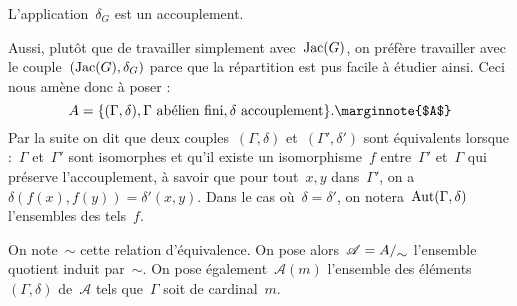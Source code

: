 	\begin{prop}
		L'application~$\delta_G$ est un accouplement.
	\end{prop}
	\begin{dem}
		[TODO]
	\end{dem}
	Aussi, plutôt que de travailler simplement avec~$\operatorname{Jac}(G)$, on préfère travailler avec le couple~$(\operatorname{Jac}(G),\delta_G)$ parce que la répartition est pus facile à étudier ainsi. Ceci nous amène donc à poser :
	\[
		A = \{(\Gamma,\delta), \Gamma\text{ abélien fini}, \delta\text{ accouplement}\}.\text{\marginnote{$A$}}
	\]
	Par la suite on dit que deux couples~$(\Gamma,\delta)$ et~$(\Gamma',\delta')$ sont équivalents lorsque :~$\Gamma$ et~$\Gamma'$ sont isomorphes et qu'il existe un isomorphisme~$f$ entre~$\Gamma'$ et~$\Gamma$ qui préserve l'accouplement, à savoir que pour tout~$x,y$ dans~$\Gamma'$, on a~$\delta(f(x),f(y)) = \delta'(x,y)$. Dans le cas où~$\delta = \delta'$, on notera~$\Aut(\Gamma,\delta)$\marginnote{$\Aut(\Gamma,\delta)$} l'ensembles des tels~$f$.
	
	On note~$\sim$ cette relation d'équivalence. On pose alors~$\mathscr{A} = \quotient{A}{\sim}$ l'ensemble quotient induit par~$\sim$. On pose également~$\mathscr{A}(m)$  l'ensemble des éléments~$(\Gamma,\delta)$ de~$\mathscr{A}$ tels que~$\Gamma$ soit de cardinal~$m$.